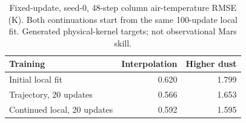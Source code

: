 \begin{table}[t]\centering\small
\caption{Fixed-update, seed-0, 48-step column air-temperature RMSE (K). Both continuations start from the same 100-update local fit. Generated physical-kernel targets; not observational Mars skill.}
\label{tab:radiation_results}\begin{tabular}{lrr}\toprule
Training & Interpolation & Higher dust \\\midrule
Initial local fit & 0.620 & 1.799 \\
Trajectory, 20 updates & 0.566 & 1.653 \\
Continued local, 20 updates & 0.592 & 1.595 \\
\bottomrule\end{tabular}\end{table}
